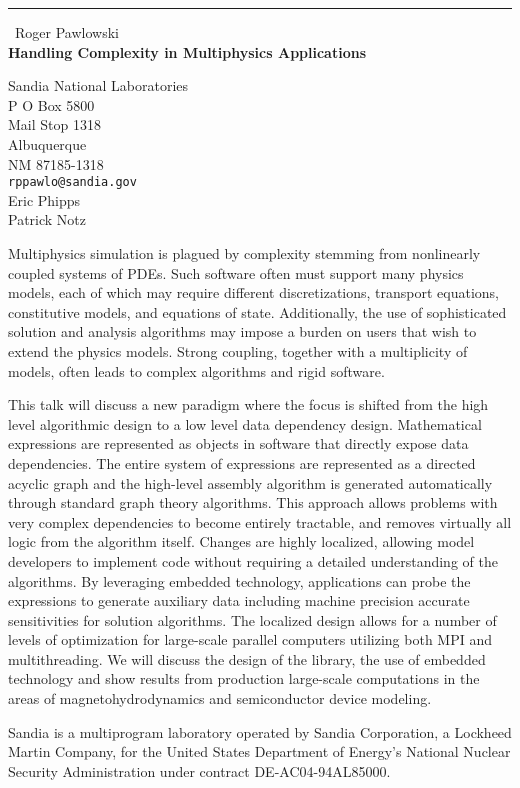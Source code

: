 \documentclass{report}
\begin{document}
\begin{center}
\rule{6in}{1pt} \
{\large Roger Pawlowski \\
{\bf Handling Complexity in Multiphysics Applications}}

Sandia National Laboratories \\ P O Box 5800 \\ Mail Stop 1318 \\ Albuquerque \\ NM 87185-1318
\\
{\tt rppawlo@sandia.gov}\\
Eric Phipps\\
Patrick Notz\end{center}

Multiphysics simulation is plagued by complexity stemming from
nonlinearly coupled systems of PDEs. Such software often must support
many physics models, each of which may require different discretizations,
transport equations, constitutive models, and equations of state.
Additionally, the use of sophisticated solution and analysis algorithms
may impose a burden on users that wish to extend the physics models.
Strong coupling, together with a multiplicity of models, often leads to
complex algorithms and rigid software.

This talk will discuss a new paradigm where the focus is shifted from the
high level algorithmic design to a low level data dependency design.
Mathematical expressions are represented as objects in software that
directly expose data dependencies. The entire system of expressions are
represented as a directed acyclic graph and the high-level assembly
algorithm is generated automatically through standard graph theory
algorithms. This approach allows problems with very complex dependencies
to become entirely tractable, and removes virtually all logic from the
algorithm itself. Changes are highly localized, allowing model developers
to implement code without requiring a detailed understanding of the
algorithms. By leveraging embedded technology, applications can probe the
expressions to generate auxiliary data including machine precision
accurate sensitivities for solution algorithms. The localized design
allows for a number of levels of optimization for large-scale parallel
computers utilizing both MPI and multithreading. We will discuss the
design of the library, the use of embedded technology and show results
from production large-scale computations in the areas of
magnetohydrodynamics and semiconductor device modeling.

Sandia is a multiprogram laboratory operated by Sandia Corporation, a
Lockheed Martin Company, for the United States Department of Energy's
National Nuclear Security Administration under contract
DE-AC04-94AL85000.
\end{document}

